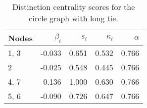 \begin{table}
\centering
\caption{\label{tab:circlelong}Distinction centrality scores for the circle graph with long tie.}
\centering
\begin{tabular}[t]{lrrrr}
\toprule
Nodes & $\beta_i$ & $s_i$ & $\kappa_i$ & $\alpha$\\
\midrule
1, 3 & -0.033 & 0.651 & 0.532 & 0.766\\
2 & -0.025 & 0.548 & 0.445 & 0.766\\
4, 7 & 0.136 & 1.000 & 0.630 & 0.766\\
5, 6 & -0.090 & 0.726 & 0.647 & 0.766\\
\bottomrule
\end{tabular}
\end{table}
